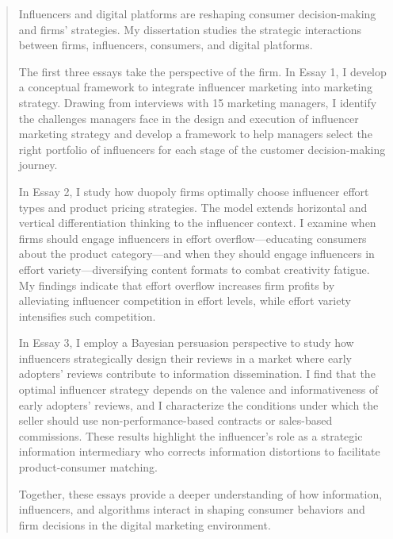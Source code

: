 \documentclass[12pt,letterpaper]{uncdissertation}
\begin{document}



\thesismaketitle 
\thesismakecopyright


\doublespacing


\begin{abstract}
Influencers and digital platforms are reshaping consumer decision-making and firms’ strategies. My dissertation studies the strategic interactions between firms, influencers, consumers, and digital platforms.

The first three essays take the perspective of the firm. In Essay 1, I develop a conceptual framework to integrate influencer marketing into marketing strategy. Drawing from interviews with 15 marketing managers, I identify the challenges managers face in the design and execution of influencer marketing strategy and develop a framework to help managers select the right portfolio of influencers for each stage of the customer decision-making journey.

In Essay 2, I study how duopoly firms optimally choose influencer effort types and product pricing strategies. The model extends horizontal and vertical differentiation thinking to the influencer context. I examine when firms should engage influencers in effort overflow—educating consumers about the product category—and when they should engage influencers in effort variety—diversifying content formats to combat creativity fatigue. My findings indicate that effort overflow increases firm profits by alleviating influencer competition in effort levels, while effort variety intensifies such competition.

In Essay 3, I employ a Bayesian persuasion perspective to study how influencers strategically design their reviews in a market where early adopters’ reviews contribute to information dissemination. I find that the optimal influencer strategy depends on the valence and informativeness of early adopters’ reviews, and I characterize the conditions under which the seller should use non-performance-based contracts or sales-based commissions. These results highlight the influencer’s role as a strategic information intermediary who corrects information distortions to facilitate product-consumer matching.



Together, these essays provide a deeper understanding of how information, influencers, and algorithms interact in shaping consumer behaviors and firm decisions in the digital marketing environment.
\end{abstract}
\end{document}
